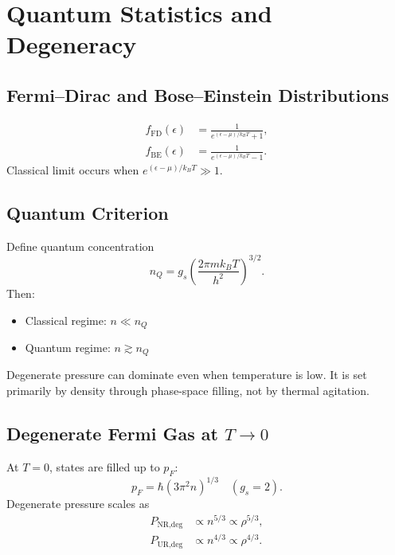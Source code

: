 \section{Quantum Statistics and Degeneracy}

\subsection{Fermi--Dirac and Bose--Einstein Distributions}
\begin{theory}
\begin{align}
    f_{\text{FD}}(\epsilon) &= \frac{1}{e^{(\epsilon-\mu)/k_BT}+1}, \\
    f_{\text{BE}}(\epsilon) &= \frac{1}{e^{(\epsilon-\mu)/k_BT}-1}.
\end{align}
Classical limit occurs when $e^{(\epsilon-\mu)/k_BT}\gg1$.
\end{theory}

\subsection{Quantum Criterion}
\begin{theory}
Define quantum concentration
\begin{equation}
    n_Q=g_s\left(\frac{2\pi mk_B T}{h^2}\right)^{3/2}.
\end{equation}
Then:
\begin{itemize}
    \item Classical regime: $n\ll n_Q$
    \item Quantum regime: $n\gtrsim n_Q$
\end{itemize}
\end{theory}

\begin{importantnote}
Degenerate pressure can dominate even when temperature is low.
It is set primarily by density through phase-space filling, not by thermal agitation.
\end{importantnote}

\subsection{Degenerate Fermi Gas at $T\to 0$}
\begin{theory}
At $T=0$, states are filled up to $p_F$:
\begin{equation}
    p_F=\hbar(3\pi^2 n)^{1/3} \quad (g_s=2).
\end{equation}
Degenerate pressure scales as
\begin{align}
    P_{\text{NR,deg}} &\propto n^{5/3}\propto \rho^{5/3}, \\
    P_{\text{UR,deg}} &\propto n^{4/3}\propto \rho^{4/3}.
\end{align}
\end{theory}


